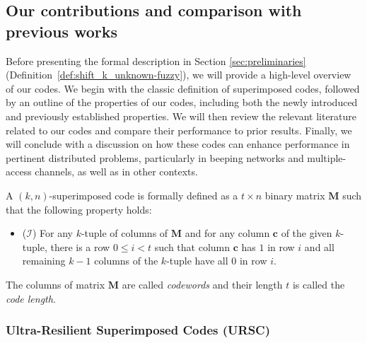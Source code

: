 \documentclass[11pt]{article}
\begin{document}
\subsection{Our contributions and comparison with previous works}

Before presenting the formal description in Section \ref{sec:preliminaries} (Definition~\ref{def:shift_k_unknown-fuzzy}), we will provide a 
high-level overview of our codes. 
We begin with the classic definition of superimposed codes, followed by an outline of the properties of our codes, including both the newly introduced and previously established 
properties.
We will then review the relevant literature related to our codes and compare their performance to prior 
results. Finally, we will conclude with a discussion on how these codes can enhance performance in pertinent 
distributed problems, particularly in beeping networks and multiple-access channels, as well as  
in other contexts.


\begin{definition}\label{classic}
A $(k, n)$-superimposed code is formally defined as a $t \times n$ binary matrix $\mathbf{M}$
such that the following property holds:
\vspace*{-1ex}
\begin{itemize}[leftmargin=5.5mm]
    \item[] (${\mathcal I}$) For any $k$-tuple of columns of $\mathbf{M}$  
and for any column $\mathbf{c}$ of the given $k$-tuple, there is a row $0 \le i < t$ 
such that column $\mathbf{c}$ has $1$ in row $i$ and all remaining $k -1$ columns of the $k$-tuple have
all $0$ in row $i$. 
\end{itemize}
\vspace*{-1ex}
The columns of matrix $\mathbf{M}$ are called {\em codewords} and their length $t$ is called the 
{\em code length}.   
\end{definition}



\subsubsection{Ultra-Resilient Superimposed Codes (URSC)}
\end{document}
